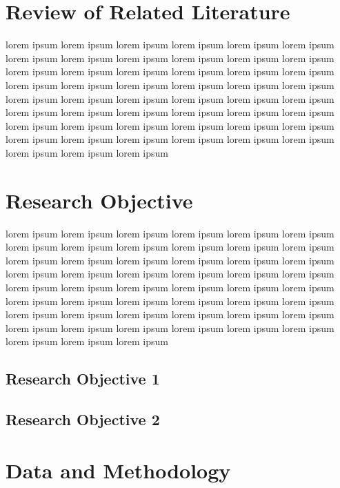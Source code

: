 \documentclass[acmtog]{acmart}
\begin{document}
\section{Review of Related Literature}

lorem ipsum  lorem ipsum  lorem ipsum  lorem ipsum  lorem ipsum  lorem ipsum  lorem ipsum  lorem ipsum  lorem ipsum  lorem ipsum  lorem ipsum  lorem ipsum  lorem ipsum  lorem ipsum  lorem ipsum  lorem ipsum  lorem ipsum  lorem ipsum  lorem ipsum  lorem ipsum  lorem ipsum  lorem ipsum  lorem ipsum  lorem ipsum  lorem ipsum  lorem ipsum  lorem ipsum  lorem ipsum  lorem ipsum  lorem ipsum  lorem ipsum  lorem ipsum  lorem ipsum  lorem ipsum  lorem ipsum  lorem ipsum  lorem ipsum  lorem ipsum  lorem ipsum  lorem ipsum  lorem ipsum  lorem ipsum  lorem ipsum  lorem ipsum  lorem ipsum  lorem ipsum  lorem ipsum  lorem ipsum  lorem ipsum  lorem ipsum  lorem ipsum

\section{Research Objective}

lorem ipsum  lorem ipsum  lorem ipsum  lorem ipsum  lorem ipsum  lorem ipsum  lorem ipsum  lorem ipsum  lorem ipsum  lorem ipsum  lorem ipsum  lorem ipsum  lorem ipsum  lorem ipsum  lorem ipsum  lorem ipsum  lorem ipsum  lorem ipsum  lorem ipsum  lorem ipsum  lorem ipsum  lorem ipsum  lorem ipsum  lorem ipsum  lorem ipsum  lorem ipsum  lorem ipsum  lorem ipsum  lorem ipsum  lorem ipsum  lorem ipsum  lorem ipsum  lorem ipsum  lorem ipsum  lorem ipsum  lorem ipsum  lorem ipsum  lorem ipsum  lorem ipsum  lorem ipsum  lorem ipsum  lorem ipsum  lorem ipsum  lorem ipsum  lorem ipsum  lorem ipsum  lorem ipsum  lorem ipsum  lorem ipsum  lorem ipsum  lorem ipsum  

\subsection{Research Objective 1}


\subsection{Research Objective 2}

\section{Data and Methodology}
\label{sec:method}
\end{document}
